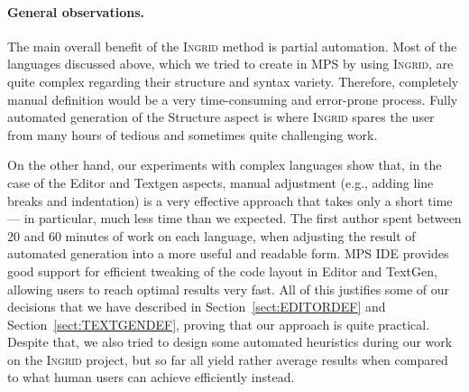\paragraph{General observations.}
The main overall benefit of the \textsc{Ingrid} method is partial automation.
Most of the languages discussed above, which we tried to create in MPS by using \textsc{Ingrid}, are quite complex regarding their structure and syntax variety.
Therefore, completely manual definition would be a very time-consuming and error-prone process.
Fully automated generation of the Structure aspect is where \textsc{Ingrid} spares the user from many hours of tedious and sometimes quite challenging work.

On the other hand, our experiments with complex languages show that, in the case of the Editor and Textgen aspects, manual adjustment (e.g., adding line breaks and indentation) is a very effective approach that takes only a short time --- in particular, much less time than we expected.
The first author spent between 20 and 60 minutes of work on each language, when adjusting the result of automated generation into a more useful and readable form.
MPS IDE provides good support for efficient tweaking of the code layout in Editor and TextGen, allowing users to reach optimal results very fast.
All of this justifies some of our decisions that we have described in Section~\ref{sect:EDITORDEF} and Section~\ref{sect:TEXTGENDEF}, proving that our approach is quite practical.
Despite that, we also tried to design some automated heuristics during our work on the \textsc{Ingrid} project, but so far all yield rather average results when compared to what human users can achieve efficiently instead.

